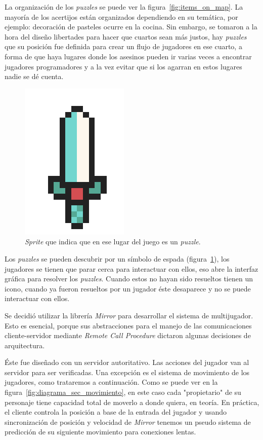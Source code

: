 La organización de los \textit{puzzles} se puede ver la figura~\ref{fig:items_on_map}. La mayoría de los acertijos están organizados dependiendo en su temática, por ejemplo: decoración de pasteles ocurre en la cocina. Sin embargo, se tomaron a la hora del diseño libertades para hacer que cuartos sean más justos, hay \textit{puzzles} que su posición fue definida para crear un flujo de jugadores en ese cuarto, a forma de que haya lugares donde los asesinos pueden ir varias veces a encontrar jugadores programadores y a la vez evitar que si los agarran en estos lugares nadie se dé cuenta.
\begin{figure}
    \centering
    \includegraphics[width=0.25\linewidth]{images/espada_sprite.png}
    \caption{\textit{Sprite} que indica que en ese lugar del juego es un \textit{puzzle}.}
    \label{fig:puzzle_location}
\end{figure}
Los \textit{puzzles} se pueden descubrir por un símbolo de espada (figura~\ref{fig:puzzle_location}), los jugadores se tienen que parar cerca para interactuar con ellos, eso abre la interfaz gráfica para resolver los \textit{puzzles}. Cuando estos no hayan sido resueltos tienen un icono, cuando ya fueron resueltos por un jugador éste desaparece y no se puede interactuar con ellos.

Se decidió utilizar la librería \textit{Mirror} para desarrollar el sistema de multijugador. Esto es esencial, porque sus abstracciones para el manejo de las comunicaciones cliente-servidor mediante \textit{Remote Call Procedure} dictaron algunas decisiones de arquitectura.

Éste fue diseñado con un servidor autoritativo. Las acciones del jugador van al servidor para ser verificadas. Una excepción es el sistema de movimiento de los jugadores, como trataremos a continuación. Como se puede ver en la figura~\ref{fig:diagrama_sec_movimiento}, en este caso cada "propietario" de su personaje tiene capacidad total de moverlo a donde quiera, en teoría. En práctica, el cliente controla la posición a base de la entrada del jugador y usando sincronización de posición y velocidad de \textit{Mirror} tenemos un pseudo sistema de predicción de su siguiente movimiento para conexiones lentas. 

